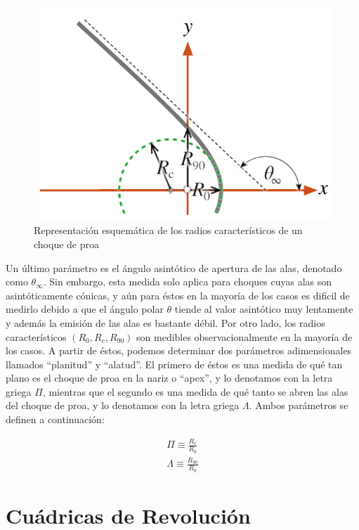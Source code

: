 \begin{figure}
  \centering
  \includegraphics[width=0.5\linewidth]{./Figures/characteristic-radii}
  \caption{Representación esquemática de los radios característicos de un choque de proa}
  \label{fig:char-radii}
\end{figure}
Un último parámetro es el ángulo asintótico de apertura de las alas, denotado como $\theta_\infty$. Sin embargo, esta medida solo aplica para choques cuyas alas son asintóticamente cónicas, y aún para éstos en la mayoría de los casos es dificil de medirlo debido a que el ángulo polar $\theta$ tiende al valor asintótico muy lentamente y además la emisión de las alas es bastante débil. Por otro lado, los radios característicos $(R_0, R_c, R_{90})$ son medibles observacionalmente en la mayoría de los casos. A partir de éstos, podemos determinar dos parámetros adimensionales llamados ``planitud'' y ``alatud''. El primero de éstos es una medida de qué tan plano es el choque de proa en la nariz o ``apex'', y lo denotamos con la letra griega $\Pi$, mientras que el segundo es una medida de qué tanto se abren las alas del choque de proa, y lo denotamos con la letra griega $\Lambda$. Ambos parámetros se definen a continuación:

\begin{align}
  \Pi \equiv \frac{R_c}{R_0} \label{eq:planitude}\\
  \Lambda \equiv \frac{R_{90}}{R_0} \label{eq:alatude}
\end{align}

\section{Cuádricas de Revolución}
\label{sec:quadrics}
\newcommand\Sin{\ensuremath{\mathcal{S}}}
\newcommand\Cos{\ensuremath{\mathcal{C}}}
\newcommand\Cot{\ensuremath{\mathcal{T}}}
\newcommand\Q{\ensuremath{\mathcal{Q}}}
\newcommand\fQi{\ensuremath{f_{\scriptscriptstyle \Q, i}}}

